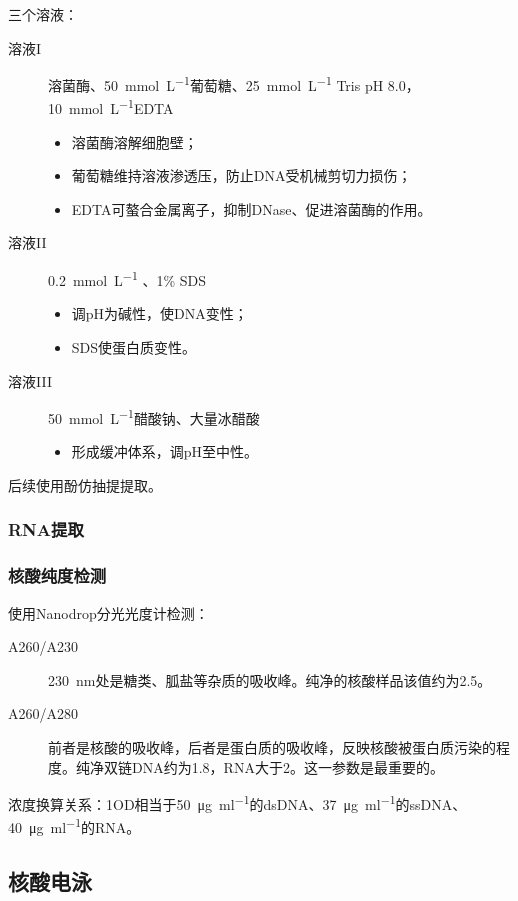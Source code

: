 三个溶液：
\begin{description}
	\item[溶液I] 溶菌酶、\SI{50}{\mmol\per\L}葡萄糖、\SI{25}{\mmol\per\L} Tris pH 8.0，\SI{10}{\mmol\per\L}EDTA
	\begin{itemize}
		\item 溶菌酶溶解细胞壁；
		\item 葡萄糖维持溶液渗透压，防止DNA受机械剪切力损伤；
		\item EDTA可螯合金属离子，抑制DNase、促进溶菌酶的作用。
	\end{itemize}
	\item[溶液II] \SI{0.2}{\mmol\per\L} 、1\% SDS
	\begin{itemize}
		\item {}调pH为碱性，使DNA变性；
		\item SDS使蛋白质变性。
	\end{itemize}
	\item[溶液III] \SI{50}{\mmol\per\L}醋酸钠、大量冰醋酸
	\begin{itemize}
		\item 形成缓冲体系，调pH至中性。
	\end{itemize}
\end{description}

后续使用酚仿抽提提取。

\subsubsection{RNA提取}


\subsubsection{核酸纯度检测}

使用Nanodrop分光光度计检测：
\begin{description}
	\item[A260/A230] \SI{230}{\nm}处是糖类、胍盐等杂质的吸收峰。纯净的核酸样品该值约为2.5。
	\item[A260/A280] 前者是核酸的吸收峰，后者是蛋白质的吸收峰，反映核酸被蛋白质污染的程度。纯净双链DNA约为1.8，RNA大于2。这一参数是最重要的。
\end{description}

浓度换算关系：1OD相当于\SI{50}{\ug\per\ml}的dsDNA、\SI{37}{\ug\per\ml}的ssDNA、\SI{40}{\ug\per\ml}的RNA。

\subsection{核酸电泳}

